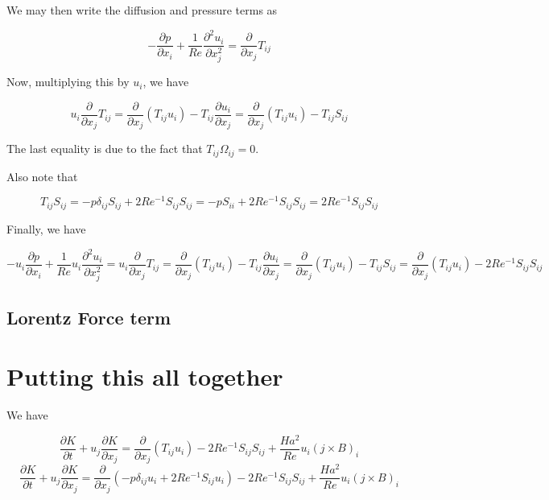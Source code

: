 \documentclass[11pt]{article}
\begin{document}
We may then write the diffusion and pressure terms as

\begin{equation}
	-\frac{\partial p}{\partial x_i}
	+ \frac{1}{Re}
	\frac{\partial^2 u_i}{\partial x_j^2}
	=
	\frac{\partial}{\partial x_j} T_{ij}
\end{equation}

Now, multiplying this by $u_i$, we have

\begin{equation}
	u_i \frac{\partial}{\partial x_j} T_{ij}
	=
	\frac{\partial}{\partial x_j} (T_{ij} u_i)
	-
	T_{ij} \frac{\partial u_i}{\partial x_j}
	=
	\frac{\partial}{\partial x_j} (T_{ij} u_i)
	- T_{ij} S_{ij}
\end{equation}

The last equality is due to the fact that $T_{ij} \Omega_{ij} = 0$.

Also note that

\begin{equation}
	T_{ij} S_{ij}
	=
	-p \delta_{ij} S_{ij}
	+ 2 Re^{-1} S_{ij} S_{ij}
	=
	-p S_{ii}
	+ 2 Re^{-1} S_{ij} S_{ij}
	=
	2 Re^{-1} S_{ij} S_{ij}
\end{equation}

Finally, we have

\begin{equation}
	-u_i \frac{\partial p}{\partial x_i}
	+ \frac{1}{Re}u_i
	\frac{\partial^2 u_i}{\partial x_j^2}
	=
	u_i \frac{\partial}{\partial x_j} T_{ij}
	=
	\frac{\partial}{\partial x_j} (T_{ij} u_i)
	-
	T_{ij} \frac{\partial u_i}{\partial x_j}
	=
	\frac{\partial}{\partial x_j} (T_{ij} u_i)
	- T_{ij} S_{ij}
	=
	\frac{\partial}{\partial x_j} (T_{ij} u_i)
	-
	2 Re^{-1} S_{ij} S_{ij}
\end{equation}


\subsection{Lorentz Force term}

\section{Putting this all together}
We have

\begin{equation}
	\frac{\partial K}{\partial t}
	+
	u_j \frac{\partial K}{\partial x_j}
	= 
	\frac{\partial}{\partial x_j} (T_{ij} u_i)
	-
	2 Re^{-1} S_{ij} S_{ij}
	+
	\frac{Ha^2}{Re}
	u_i
	(j \times B)_i
\end{equation}
\begin{equation}
	\boxed{
	\frac{\partial K}{\partial t}
	+
	u_j \frac{\partial K}{\partial x_j}
	= 
	\frac{\partial}{\partial x_j} 
	(
	-p \delta_{ij}
	u_i
	+
	2 Re^{-1}
	S_{ij}
	u_i
	)
	-
	2 Re^{-1} S_{ij} S_{ij}
	+
	\frac{Ha^2}{Re}
	u_i
	(j \times B)_i
	}
\end{equation}
\end{document}
